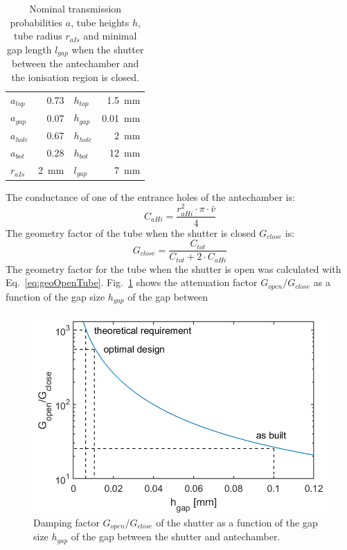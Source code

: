 	\begin{table}[H]
		\begin{center}
			\begin{tabular}{|l r| l r| }
				\hline
				$a_{top}$	& 0.73 	& $h_{top}$		& 1.5~mm	\\
				$a_{gap}$	& 0.07 	& $h_{gap}$		& 0.01~mm \\
				$a_{hole}$ 	& 0.67 	& $h_{hole}$ 	& 2~mm\\
				$a_{bot}$ 	& 0.28 	& $h_{bot}$ 	& 12~mm\\
				$r_{aIs}$ 	& 2~mm & $l_{gap}$ 	& 7~mm\\
				\hline
			\end{tabular}
		\end{center}
		\caption{Nominal transmission probabilities $a$, tube heights $h$, tube radius $r_{aIs}$ and minimal gap length $l_{gap}$ when the shutter between the antechamber and the ionisation region is closed.}
		\label{tab:thMolFloConMotClosPara}
	\end{table}
	The conductance of one of the entrance holes of the antechamber is:
	\begin{equation}
		C_{aHi} = \frac{r_{aHi}^2\cdot\pi\cdot\bar{v}}{4}
	\end{equation}
	The geometry factor of the tube when the shutter is closed $G_{close}$ is:
	\begin{equation}
		G_{close} = \frac{C_{tot}}{C_{tot} + 2\cdot C_{aHi}}
	\end{equation}
	The geometry factor for the tube when the shutter is open was calculated with Eq.~\eqref{eq:geoOpenTube}. Fig.~\ref{fig:ShutGapSizeSigDamp} shows the attenuation factor $G_{open}/G_{close}$ as a function of the gap size $h_{gap}$ of the gap between
	\begin{figure}[H]
		\centering
		\includegraphics[width=.8\textwidth]{Bilder/Motor_1p2mm.png}
		\caption{Damping factor $G_{open}/G_{close}$ of the shutter as a function of the gap size $h_{gap}$ of the gap between the shutter and antechamber.}
		\label{fig:ShutGapSizeSigDamp}
	\end{figure}
